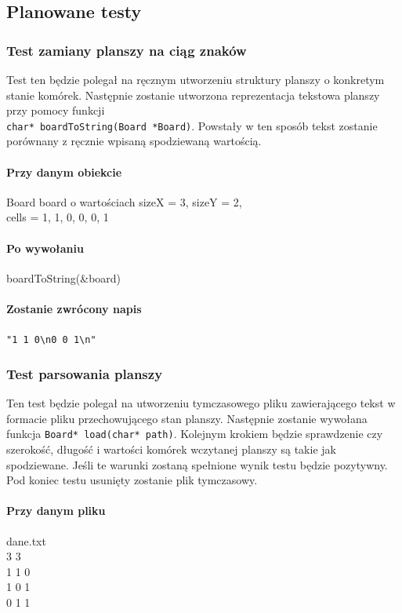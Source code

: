 \documentclass{article}
\begin{document}
\subsection{Planowane testy}

\subsubsection{Test zamiany planszy na ciąg znaków} 
Test ten będzie polegał na ręcznym utworzeniu struktury planszy o konkretym stanie komórek. Następnie zostanie utworzona reprezentacja tekstowa planszy przy pomocy funkcji \\ \texttt{char* boardToString(Board *Board)}. Powstały w ten sposób tekst zostanie porównany z ręcznie wpisaną spodziewaną wartością.

\paragraph{Przy danym obiekcie} Board board o wartościach sizeX = 3, sizeY = 2, \\ cells = {1, 1, 0, 0, 0, 1 }
\paragraph{Po wywołaniu} boardToString(\&board)
\paragraph{Zostanie zwrócony napis} \texttt{"1 1 0\textbackslash{}n0 0 1\textbackslash{}n"}


\subsubsection{Test parsowania planszy}
Ten test będzie polegał na utworzeniu tymczasowego pliku zawierającego tekst w formacie pliku przechowującego stan planszy. Następnie zostanie wywołana funkcja \texttt{Board* load(char* path)}. Kolejnym krokiem będzie sprawdzenie czy szerokość, długość i wartości komórek wczytanej planszy są takie jak spodziewane. Jeśli te warunki zostaną spełnione wynik testu będzie pozytywny. Pod koniec testu usunięty zostanie plik tymczasowy.

\paragraph{Przy danym pliku} dane.txt \\
3 3\\
1 1 0\\
1 0 1\\
0 1 1\\
\end{document}
